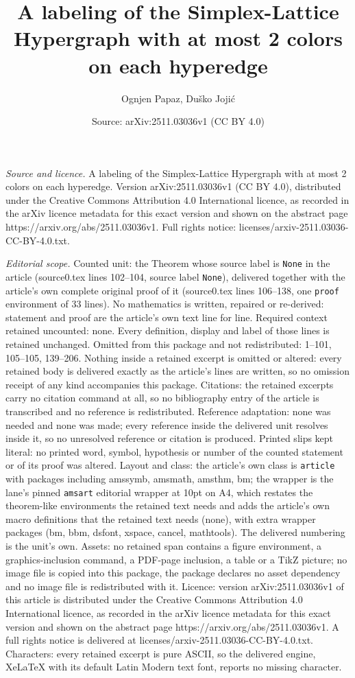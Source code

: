 \documentclass[10pt,a4paper]{amsart}
\title[A labeling of the Simplex-Lattice Hypergraph with at most 2 ]{A labeling of the Simplex-Lattice Hypergraph with at most 2 colors on each hyperedge}
\author{Ognjen Papaz, Du\v{s}ko Joji\'c}
\date{Source: arXiv:2511.03036v1 (CC BY 4.0)}
\begin{document}
\maketitle

\noindent\emph{Source and licence.} A labeling of the Simplex-Lattice Hypergraph with at most 2 colors on each hyperedge. Version arXiv:2511.03036v1 (CC BY 4.0), distributed under the Creative Commons Attribution 4.0 International licence, as recorded in the arXiv licence metadata for this exact version and shown on the abstract page https://arxiv.org/abs/2511.03036v1. Full rights notice: licenses/arxiv-2511.03036-CC-BY-4.0.txt.\par\smallskip

\noindent\textit{Editorial scope.} Counted unit: the Theorem whose source label is \texttt{None} in the article (source0.tex lines 102--104, source label \texttt{None}), delivered together with the article's own complete original proof of it (source0.tex lines 106--138, one \texttt{proof} environment of 33 lines). No mathematics is written, repaired or re-derived: statement and proof are the article's own text line for line. Required context retained uncounted: none. Every definition, display and label of those lines is retained unchanged. Omitted from this package and not redistributed: 1--101, 105--105, 139--206. Nothing inside a retained excerpt is omitted or altered: every retained body is delivered exactly as the article's lines are written, so no omission receipt of any kind accompanies this package. Citations: the retained excerpts carry no citation command at all, so no bibliography entry of the article is transcribed and no reference is redistributed. Reference adaptation: none was needed and none was made; every reference inside the delivered unit resolves inside it, so no unresolved reference or citation is produced. Printed slips kept literal: no printed word, symbol, hypothesis or number of the counted statement or of its proof was altered. Layout and class: the article's own class is \texttt{article} with packages including amssymb, amsmath, amsthm, bm; the wrapper is the lane's pinned \texttt{amsart} editorial wrapper at 10pt on A4, which restates the theorem-like environments the retained text needs and adds the article's own macro definitions that the retained text needs (none), with extra wrapper packages (bm, bbm, dsfont, xspace, cancel, mathtools). The delivered numbering is the unit's own. Assets: no retained span contains a figure environment, a graphics-inclusion command, a PDF-page inclusion, a table or a TikZ picture; no image file is copied into this package, the package declares no asset dependency and no image file is redistributed with it. Licence: version arXiv:2511.03036v1 of this article is distributed under the Creative Commons Attribution 4.0 International licence, as recorded in the arXiv licence metadata for this exact version and shown on the abstract page https://arxiv.org/abs/2511.03036v1. A full rights notice is delivered at licenses/arxiv-2511.03036-CC-BY-4.0.txt. Characters: every retained excerpt is pure ASCII, so the delivered engine, XeLaTeX with its default Latin Modern text font, reports no missing character.
\end{document}
